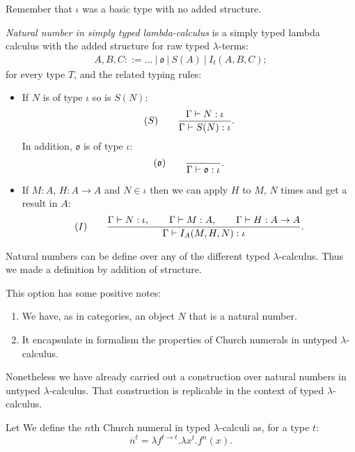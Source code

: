 \begin{remark}
  Remember that $\iota$ was a basic type with no added structure.
\end{remark}
\begin{definition}
  \emph{Natural number in simply typed lambda-calculus} is a simply typed lambda calculus with the added structure for raw typed $\lambda$-terms:
  \begin{align*}
    A,B, C ::= ...\ |\ \mathfrak{o}\ |\ S(A)\ |\ I_t(A,B,C);
  \end{align*}
  for every type $T$, and the related typing rules:
  \begin{itemize}
  \item If $N$ is of type $\iota$ so is $S(N)$:
    $$  (S)\qquad  {\displaystyle\Gamma \vdash N:\iota \over \Gamma \vdash S(N):\iota}.$$
    In addition, $\mathfrak{o}$ is of type $\iota$:
    $$  (\mathfrak{o})\qquad  {\displaystyle\over \Gamma \vdash \mathfrak{o}:\iota}.$$
  \item If $M: A$, $H: A\to A$ and $N\in \iota$ then we can apply $H$ to $M$, $N$ times and get a result in $A$:
    $$  (I)\qquad  {\displaystyle\Gamma \vdash N:\iota, \qquad \Gamma \vdash M:A,\qquad \Gamma \vdash H:A\to A \over \Gamma \vdash I_A(M,H,N):\iota}.$$
  \end{itemize}
\end{definition}

\begin{remark} \label{remark-natural-numbers}
  Natural numbers can be define over any of the different typed $\lambda$-calculus. Thus we made a definition by addition of structure. 
\end{remark}

This option has some positive notes:
\begin{enumerate}
\item We have, as in categories, an object $N$ that is a natural number.
\item It encapsulate in formalism the properties of Church numerals in untyped $\lambda$-calculus.
\end{enumerate}

Nonetheless we have already carried out a construction over natural numbers in untyped $\lambda$-calculus. That construction is replicable in the context of typed $\lambda$-calculus.

\begin{definition}
  Let We define the $n$th Church numeral in typed $\lambda$-calculi as, for a type $t$:
  $$\overline n^t = \lambda f^{t \to t}. \lambda x^{t}. f^{n}(x).$$
  
\end{definition}

